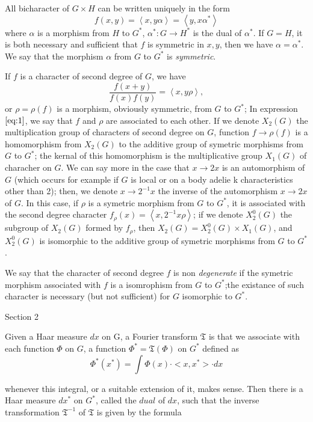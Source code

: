 \documentclass[12pt]{amsart}
\def\inn#1#2{\left\langle{#1},{#2}\right\rangle}
\newcounter{ssection}
\renewcommand{\subsection}{
  \addtocounter{ssection}{1}{\bf  \arabic{ssection}.\  }}
\begin{document}
All bicharacter of $G\times H$ can be written uniquely in the form 
\[
f(x,y)=\inn{x}{y\alpha}=\inn{y}{x\alpha^*}
\]
where $\alpha$ is a morphism from $H$ to $G^*$, 
$\alpha^*\colon G\to H^*$ is the dual of $\alpha^*$.
If $G=H$, it is both necessary and sufficient that $f$ is symmetric 
in $x, y$, then we have $\alpha=\alpha^*$.
We say that the morphism $\alpha$ from $G$ to $G^*$ is {\it symmetric}. 
 
If $f$ is a character of second degree of $G$, we have 
\begin{equation}\label{eq:1}
\frac{f(x+y)}{f(x)f(y)} = \inn{x}{y\rho},
\end{equation}
or $\rho=\rho(f)$ is a morphism, obviously symmetric, from $G$ to
$G^*$;
In expression $\ref{eq:1}$, we say that $f$ and $\rho$ are associated
to each other. If we denote $X_2(G)$  the multiplication group of 
characters of second degree on $G$, function $f\to \rho(f)$ is a
homomorphism from $X_2(G)$ to the additive group of symetric
morphisms from $G$ to $G^*$;
the kernal of this homomorphism is the multiplicative group $X_1(G)$
of characher on $G$.
We can say more in the case that $x\to 2x$ is an automorphism of $G$
 (which occurs for example if $G$ is local or on a body adelie k
 characteristics other than 2);
then, we denote $x\to 2^{-1}x$  the inverse of the automorphism $x\to
2x$ of $G$. In this case, if $\rho$ is a symetric morphism from $G$ to
$G^*$,
it is associated with the second degree character
 $f_\rho(x)=\inn{x}{2^{-1}x\rho}$; if we denote $X^0_2(G)$ the
 subgroup of $X_2(G)$ formed by $f_\rho$, then $X_2(G) =
 X^0_2(G)\times X_1(G)$, and $X^0_2(G)$ is isomorphic to the additive
 group of symetric morphisms from $G$ to $G^*$.

We say that the character of second degree $f$ is non {\it degenerate} 
if the symetric morphism associated with $f$ is a isomrophism from $G$ 
to $G^*$;the existance of such character is necessary (but not
sufficient) for $G$ isomorphic to $G^*$.

\subsection{}
Section 2

Given a Haar measure $dx$ on G, a Fourier transform $\mathfrak{T}$
is that we associate with each function $\Phi$ on $G$, a function
$\Phi^{*}=\mathfrak{T}(\Phi)$ on $G^{*}$ defined as \[
\Phi^{*}(x^{*})=\int\Phi(x)\cdot<x,x^{*}>\cdot dx\]


\noindent whenever this integral, or a suitable extension of it, makes
sense. Then there is a Haar measure $dx^{*}$ on $G^{*}$, called
the $dual$ of $dx$, such that the inverse transformation $\mathfrak{T}^{-1}$
of $\mathfrak{T}$ is given by the formula
\end{document}
